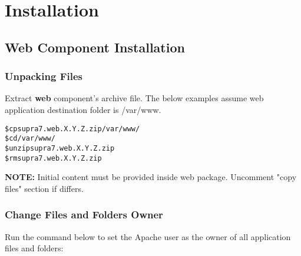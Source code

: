 \documentclass[12pt]{article}
\newcommand{\vigShowNotes}{1}
\newcommand{\vigPackageName}{supra7}
\newcommand{\vigPathToProject}{/var/www}
\newcommand{\vigPathToSrc}{/src}
\newcommand{\vigPathToWebroot}{\vigPathToSrc/webroot}
\newcommand{\note}[1]{
\textbf{NOTE:} 
#1
}
\begin{document}
\section{Installation}

\subsection{Web Component Installation}

\subsubsection{Unpacking Files}

Extract \textbf{web} component's archive file. The below examples assume web application destination folder is \textsf{{\vigPathToProject}}.

\begin{alltt}
\$ cp {\vigPackageName}.web.X.Y.Z.zip \vigPathToProject/
\$ cd \vigPathToProject/
\$ unzip {\vigPackageName}.web.X.Y.Z.zip
\$ rm {\vigPackageName}.web.X.Y.Z.zip
\end{alltt}

\note{Initial content must be provided inside web package. Uncomment "copy files" section if differs.}

%
%
%
%

\subsubsection{Change Files and Folders Owner\label{fileOwnerSection}}

Run the command below to set the Apache user as the owner of all application files and folders:
\end{document}

